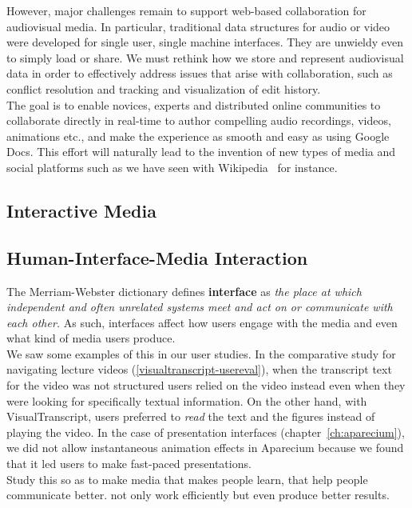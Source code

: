 However, major challenges remain to support web-based collaboration for audiovisual media. In particular, traditional data structures for audio or video were developed for single user, single machine interfaces. They are unwieldy even to simply load or share. We must rethink how we store and represent audiovisual data in order to effectively address issues that arise with collaboration, such as conflict resolution and tracking and visualization of edit history.\\

The goal is to enable novices, experts and distributed online communities to collaborate directly in real-time to author compelling audio recordings, videos, animations etc., and make the experience as smooth and easy as using Google Docs. This effort will naturally lead to the invention of new types of media and social platforms such as we have seen with Wikipedia~\cite{wiki2017} for instance.

\subsection{Interactive Media}

\subsection{Human-Interface-Media Interaction}
The Merriam-Webster dictionary defines \textbf{interface} as \emph{the place at which independent and often unrelated systems meet and act on or communicate with each other.} As such, interfaces affect how users engage with the media and even what kind of media users produce.\\

We saw some examples of this in our user studies. In the comparative study for navigating lecture videos (\ref{visualtranscript-usereval}), when the transcript text for the video was not structured users relied on the video instead even when they were looking for specifically textual information. On the other hand, with VisualTranscript, users preferred to \textit{read} the text and the figures instead of playing the video. In the case of presentation interfaces (chapter~\ref{ch:aparecium}), we did not allow instantaneous animation effects in Aparecium because we found that it led users to make fast-paced presentations.\\


Study this so as to make media that makes people learn, that help people communicate better. not only work efficiently but even produce better results.